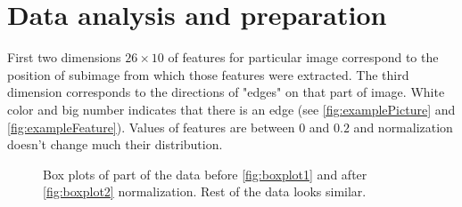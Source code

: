 \documentclass[]{report}
\begin{document}
\section{Data analysis and preparation}
  First two dimensions $26\times10$ of features for particular image correspond to the position of subimage from which those features were extracted. The third dimension corresponds to the directions of "edges" on that part of image. White color and big number indicates that there is an edge (see \ref{fig:examplePicture} and \ref{fig:exampleFeature}). Values of features are between $0$ and $0.2$ and normalization doesn't change much their distribution.
  \begin{figure}[!h]
  \center
  \;
  \caption{Box plots of part of the data before \ref{fig:boxplot1} and after \ref{fig:boxplot2} normalization. Rest of the data looks similar.}
\end{figure}
  
\end{document}
